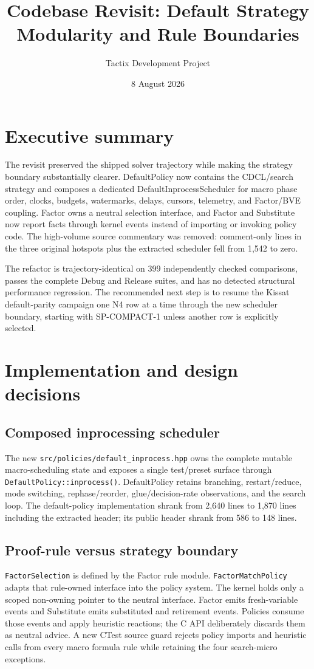 \documentclass[11pt]{article}
\title{Codebase Revisit: Default Strategy Modularity and Rule Boundaries}
\author{Tactix Development Project}
\date{8 August 2026}
\begin{document}
\maketitle

\section*{Executive summary}
The revisit preserved the shipped solver trajectory while making the strategy
boundary substantially clearer.  DefaultPolicy now contains the CDCL/search
strategy and composes a dedicated DefaultInprocessScheduler for macro phase
order, clocks, budgets, watermarks, delays, cursors, telemetry, and Factor/BVE
coupling.  Factor owns a neutral selection interface, and Factor and Substitute
now report facts through kernel events instead of importing or invoking policy
code.  The high-volume source commentary was removed: comment-only lines in the
three original hotspots plus the extracted scheduler fell from 1,542 to zero.

The refactor is trajectory-identical on 399 independently checked comparisons,
passes the complete Debug and Release suites, and has no detected structural
performance regression.  The recommended next step is to resume the Kissat
default-parity campaign one N4 row at a time through the new scheduler boundary,
starting with SP-COMPACT-1 unless another row is explicitly selected.

\section{Implementation and design decisions}
\subsection{Composed inprocessing scheduler}
The new \texttt{src/policies/default\_inprocess.hpp} owns the complete mutable
macro-scheduling state and exposes a single test/preset surface through
\texttt{DefaultPolicy::inprocess()}.  DefaultPolicy retains branching,
restart/reduce, mode switching, rephase/reorder, glue/decision-rate observations,
and the search loop.  The default-policy implementation shrank from 2,640 lines
to 1,870 lines including the extracted header; its public header shrank from
586 to 148 lines.

\subsection{Proof-rule versus strategy boundary}
\texttt{FactorSelection} is defined by the Factor rule module.
\texttt{FactorMatchPolicy} adapts that rule-owned interface into the policy
system.  The kernel holds only a scoped non-owning pointer to the neutral
interface.  Factor emits fresh-variable events and Substitute emits substituted
and retirement events.  Policies consume those events and apply heuristic
reactions; the C API deliberately discards them as neutral advice.  A new CTest
source guard rejects policy imports and heuristic calls from every macro formula
rule while retaining the four search-micro exceptions.
\end{document}

